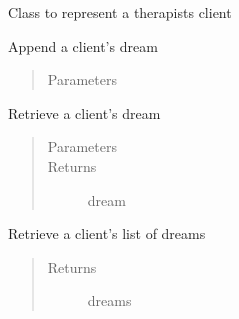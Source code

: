 \documentclass[letterpaper,10pt,english]{sphinxmanual}
\begin{document}
\begin{fulllineitems}
\label{\detokenize{index:Fralysis.Client.Client}}
Class to represent a therapists client

\begin{fulllineitems}
\label{\detokenize{index:Fralysis.Client.Client.add_dream}}
Append a client’s dream
\begin{quote}\begin{description}
\item[{Parameters}] \leavevmode
{} \textendash{} 

\end{description}\end{quote}

\end{fulllineitems}


\begin{fulllineitems}
\label{\detokenize{index:Fralysis.Client.Client.get_dream}}
Retrieve a client’s dream
\begin{quote}\begin{description}
\item[{Parameters}] \leavevmode
{} \textendash{} 

\item[{Returns}] \leavevmode
dream

\end{description}\end{quote}

\end{fulllineitems}


\begin{fulllineitems}
\label{\detokenize{index:Fralysis.Client.Client.get_dreams}}
Retrieve a client’s list of dreams
\begin{quote}\begin{description}
\item[{Returns}] \leavevmode
dreams


\end{description}
\end{quote}
\end{fulllineitems}
\end{fulllineitems}
\end{document}
